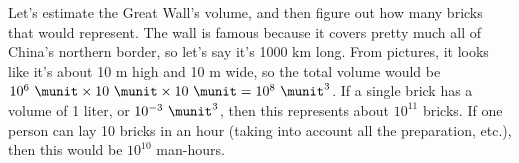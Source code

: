 Let's estimate the Great Wall's volume, and then figure out how many
bricks that would represent.
The wall is famous because it covers pretty much all of China's
northern border, so let's say it's 1000 km long. From pictures, it
looks like it's about 10 m high and 10 m wide, so the total volume
would be $10^6\ \munit\times10\ \munit\times10\ \munit=10^8\ \munit^3$.
If a single brick has a volume of 1 liter, or $10^{-3}\ \munit^3$, then
this represents about $10^{11}$ bricks. If one person can lay 10 bricks
in an hour (taking into account all the preparation, etc.), then this
would be $10^{10}$ man-hours.



